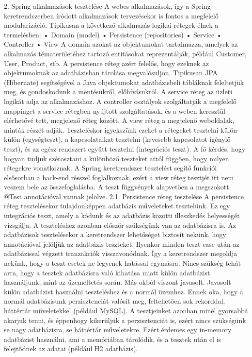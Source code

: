 \documentclass[a4paper, 12 pt]{article}
\begin{document}
2. Spring alkalmazások tesztelése
A webes alkalmazások, így a Spring keretrendszerben íródott alkalmazások tervezésekor is fontos a megfelelő modularizáció. Tipikusan a következő alkalmazás logikai rétegek élnek a termelésben:
    • Domain (model)
    • Persistence (repositories)
    • Service
    • Controller
    • View
A domain azokat az objektumokat tartalmazza, amelyek az alkalmazás tématerületéhez tartozó entitásokat reprezentálják, például Customer, User, Product, stb.
A persistence réteg azért felelős, hogy ezeknek az objektumoknak az adatbázisban tárolása megvalósuljon. Tipikusan JPA (Hibernate) segítségével a Java objektumokat adatbázisbeli tábláknak feleltetjük meg, és gondoskodunk a mentésükről, előhívásukról.
A service réteg az üzleti logikát adja az alkalmazáshoz.
A controller osztályok szolgáltatják a megfelelő mappinget a service rétegben nyújtott szolgáltatások, és a weben keresztül elérhetővé tett, megjelenő réteg között. A view réteg a megjelenő weboldalak, minták részét adják.
Teszteléskor igyekszünk ezeket a rétegeket tesztelni külön-külön (egységteszt), a kapcsolataikat tesztelni (kevesebb kapcsolatot igénylő teszt), és az egész rendszert együtt tesztelni (integrációs teszt).
A fő kérdés, hogy hogyan tudjuk szétosztani a különböző teszteket attól függően, hogy milyen rétegekre vonatkoznak.
A Spring keretrendszer tesztelést segítő funkciói elsősorban a back-end résszel foglalkoznak, ezért a view réteg tesztjét itt nem veszem bele az összefoglalásba. A teszt függvények alapvetően a megszokott @Test annotációval vannak jelölve.
2.1. Persistence réteg tesztelése
A persistence réteg tesztelésekor tulajdonképpen adatbázis műveleteket tesztelünk. Ez egy integrációs teszt, amely a kódunk és az adatbázis közötti illeszkedés helyességét vizsgálja. A teszteléshez azonban először szükségünk van az adatbázisra is.
Az adatbázisok tesztelésekor a keretrendszer lehetőséget biztosít nekünk, hogy annotációval jelöljük az adatbázis teszteket. Ilyenkor minden teszt case után az adatbázissal végzett tranzakciók visszavonódnak. Így a keretrendszer megoldja nekünk, hogy a teszt esetek ne legyenek hatással egymásra. Nincs szükség tehát arra, hogy a tesztek adatbázisra való kihatása miatt külön adatbázist használjunk, mint az üzemeltetés során. Más okból viszont javasolt.
Javasolt külön adatbázist használni teszteléshez és a normál üzemhez. Ennek oka, hogy a normál adatbázisunk perzisztenciát valósít meg, feltehetően sok rekorddal, háttértár műveletekkel (például MySQL). A tesztjeinket azonban minél gyorsabbá akarjuk tenni, és éppenhogy kikerüljük a perzisztenciát is, ezért nincs szükségünk se nagy adatbázisra, se háttértár műveletekre. Ezért érdemes egy in-memory adatbázist használni, ami a memóriában tárolódik, és a tesztek után el is felejtődnek az adatai (például H2 adatbázis).
\end{document}
